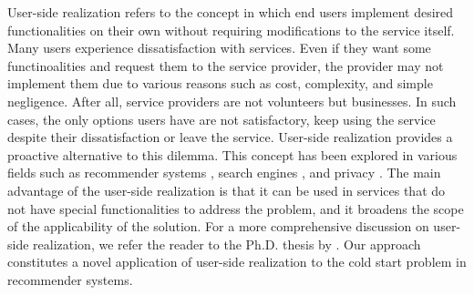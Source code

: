 User-side realization refers to the concept in which end users implement desired functionalities on their own without requiring modifications to the service itself. Many users experience dissatisfaction with services. Even if they want some functinoalities and request them to the service provider, the provider may not implement them due to various reasons such as cost, complexity, and simple negligence. After all, service providers are not volunteers but businesses. In such cases, the only options users have are not satisfactory, keep using the service despite their dissatisfaction or leave the service. User-side realization provides a proactive alternative to this dilemma. This concept has been explored in various fields such as recommender systems \cite{sato2022private, sato2022towards, sato2024overhead}, search engines \cite{sato2022retreiving, sato2022clear, diligenti2000focused, radlinski2006improving, nakano2021webgpt}, and privacy \cite{sato2024making}. The main advantage of the user-side realization is that it can be used in services that do not have special functionalities to address the problem, and it broadens the scope of the applicability of the solution. For a more comprehensive discussion on user-side realization, we refer the reader to the Ph.D. thesis by \cite{sato2024user}. Our approach constitutes a novel application of user-side realization to the cold start problem in recommender systems.